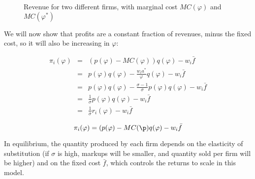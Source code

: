\documentclass[11pt,letterpaper]{article}
\begin{document}
\begin{figure}
    \caption{Revenue for two different firms, with marginal cost $MC(\varphi)$ and $MC(\varphi^*)$ }
    \label{fig:revenues}
\end{figure}

We will now show that profits are a constant fraction of revenues, minus the fixed cost, so it will also be increasing in $\varphi$:

\begin{eqnarray*}
    \pi_i(\varphi) &=& \left(p(\varphi) - MC(\varphi) \right) q(\varphi) - w_i \bar{f}  \\
    &=& p(\varphi)q(\varphi) - \frac{w_ia^*}{\varphi} q(\varphi) - w_i \bar{f}  \\
    &=& p(\varphi)q(\varphi) - \frac{\sigma-1}{\sigma} p(\varphi) q(\varphi) - w_i \bar{f}  \\
    &=& \frac{1}{\sigma} p(\varphi)q(\varphi) - w_i \bar{f}  \\
    &=& \frac{1}{\sigma} r_i(\varphi) - w_i \bar{f} 
\end{eqnarray*}



\begin{equation*}
    \pi_i(\varphi) = (p(\varphi) - MC(\p) q(\varphi) - w_i \bar{f} 
\end{equation*}

In equilibrium, the quantity produced by each firm depends on the elasticity of substitution (if $\sigma$ is high, markups will be smaller, and quantity sold per firm will be higher) and on the fixed cost $\bar{f}$, which controls the returns to scale in this model. 
\end{document}
